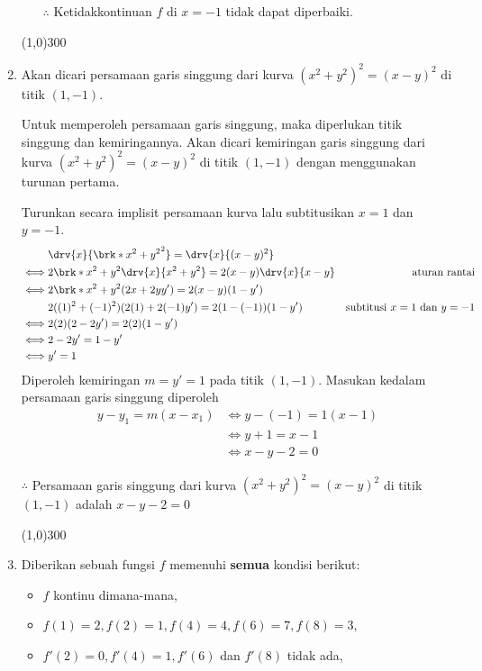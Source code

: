\begin{enumerate}[leftmargin=*, label={\arabic*}.]
\begin{enumerate}[label={\alph*}.]
    $\therefore$ Ketidakkontinuan $f$ di $x=-1$ tidak dapat diperbaiki.
\end{enumerate}
\begin{center}
    \line(1,0){300}
\end{center}
\item Akan dicari persamaan garis singgung dari kurva $(x^2+y^2)^2=(x-y)^2$ di titik $(1,-1)$.

Untuk memperoleh persamaan garis singgung, maka diperlukan titik singgung dan kemiringannya.
Akan dicari kemiringan garis singgung dari kurva $(x^2+y^2)^2=(x-y)^2$ di titik $(1,-1)$ dengan 
menggunakan turunan pertama.

Turunkan secara implisit persamaan kurva lalu subtitusikan $x=1$ dan $y=-1$.
\begin{align*}
    &\drv{x}{\brk*{x^{2}+y^{2}}^{2}} = \drv{x}{(x-y)^{2}}\\
    \iff &2\brk*{x^{2}+y^{2}}\drv{x}{x^{2}+y^{2}} = 2(x-y)\drv{x}{x-y}
    &\text{aturan rantai}\\
    \iff &2\brk*{x^{2}+y^{2}}(2x+2yy') = 2(x-y)(1-y')\\
    &2((1)^{2}+(-1)^{2})(2(1)+2(-1)y') = 2(1-(-1))(1-y')
    &\text{subtitusi $x=1$ dan $y=-1$}\\
    \iff &2(2)(2-2y')=2(2)(1-y')\\
    \iff & 2-2y'=1-y'\\
    \iff & y'=1
\end{align*}
Diperoleh kemiringan $m=y'=1$ pada titik $(1,-1)$.
Masukan kedalam persamaan garis singgung diperoleh
\begin{align*}
    y-y_{1} = m(x-x_{1}) &\iff y-(-1)=1(x-1)\\
    &\iff y+1 = x-1\\
    &\iff x-y-2=0 
\end{align*}

$\therefore$ Persamaan garis singgung dari kurva $(x^2+y^2)^2=(x-y)^2$ di titik $(1,-1)$ adalah 
$x-y-2=0$
\begin{center}
    \line(1,0){300}
\end{center}
\item Diberikan sebuah fungsi $f$ memenuhi \textbf{semua} kondisi berikut:
\begin{itemize}
    \item $f$ kontinu dimana-mana,
    \item $f(1)=2,f(2)=1,f(4)=4,f(6)=7,f(8)=3$,
    \item $f'(2)=0,f'(4)=1,f'(6)$ dan $f'(8)$ tidak ada,
    

\end{itemize}
\end{enumerate}
